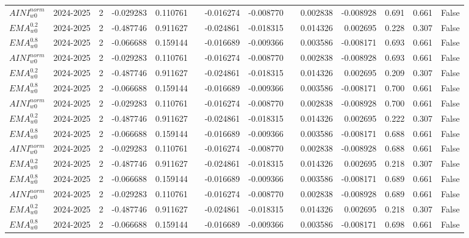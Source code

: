 \begin{tabular}{@{}llrrrrrrrrrlll@{}}
$AINI^{norm}_{w0}$ & 2024-2025 & 2 & -0.029283 & 0.110761 &  & -0.016274 & -0.008770 &  & 0.002838 & -0.008928 & 0.691 & 0.661 & False \\
$EMA^{0.2}_{w0}$ & 2024-2025 & 2 & -0.487746 & 0.911627 &  & -0.024861 & -0.018315 &  & 0.014326 & 0.002695 & 0.228 & 0.307 & False \\
$EMA^{0.8}_{w0}$ & 2024-2025 & 2 & -0.066688 & 0.159144 &  & -0.016689 & -0.009366 &  & 0.003586 & -0.008171 & 0.693 & 0.661 & False \\
$AINI^{norm}_{w0}$ & 2024-2025 & 2 & -0.029283 & 0.110761 &  & -0.016274 & -0.008770 &  & 0.002838 & -0.008928 & 0.693 & 0.661 & False \\
$EMA^{0.2}_{w0}$ & 2024-2025 & 2 & -0.487746 & 0.911627 &  & -0.024861 & -0.018315 &  & 0.014326 & 0.002695 & 0.209 & 0.307 & False \\
$EMA^{0.8}_{w0}$ & 2024-2025 & 2 & -0.066688 & 0.159144 &  & -0.016689 & -0.009366 &  & 0.003586 & -0.008171 & 0.700 & 0.661 & False \\
$AINI^{norm}_{w0}$ & 2024-2025 & 2 & -0.029283 & 0.110761 &  & -0.016274 & -0.008770 &  & 0.002838 & -0.008928 & 0.700 & 0.661 & False \\
$EMA^{0.2}_{w0}$ & 2024-2025 & 2 & -0.487746 & 0.911627 &  & -0.024861 & -0.018315 &  & 0.014326 & 0.002695 & 0.222 & 0.307 & False \\
$EMA^{0.8}_{w0}$ & 2024-2025 & 2 & -0.066688 & 0.159144 &  & -0.016689 & -0.009366 &  & 0.003586 & -0.008171 & 0.688 & 0.661 & False \\
$AINI^{norm}_{w0}$ & 2024-2025 & 2 & -0.029283 & 0.110761 &  & -0.016274 & -0.008770 &  & 0.002838 & -0.008928 & 0.688 & 0.661 & False \\
$EMA^{0.2}_{w0}$ & 2024-2025 & 2 & -0.487746 & 0.911627 &  & -0.024861 & -0.018315 &  & 0.014326 & 0.002695 & 0.218 & 0.307 & False \\
$EMA^{0.8}_{w0}$ & 2024-2025 & 2 & -0.066688 & 0.159144 &  & -0.016689 & -0.009366 &  & 0.003586 & -0.008171 & 0.689 & 0.661 & False \\
$AINI^{norm}_{w0}$ & 2024-2025 & 2 & -0.029283 & 0.110761 &  & -0.016274 & -0.008770 &  & 0.002838 & -0.008928 & 0.689 & 0.661 & False \\
$EMA^{0.2}_{w0}$ & 2024-2025 & 2 & -0.487746 & 0.911627 &  & -0.024861 & -0.018315 &  & 0.014326 & 0.002695 & 0.218 & 0.307 & False \\
$EMA^{0.8}_{w0}$ & 2024-2025 & 2 & -0.066688 & 0.159144 &  & -0.016689 & -0.009366 &  & 0.003586 & -0.008171 & 0.698 & 0.661 & False \\

\end{tabular}
